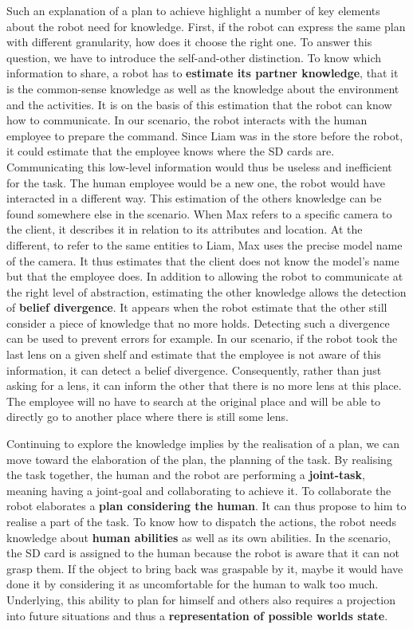 Such an explanation of a plan to achieve highlight a number of key elements about the robot need for knowledge. First, if the robot can express the same plan with different granularity, how does it choose the right one. To answer this question, we have to introduce the self-and-other distinction. To know which information to share, a robot has to \textbf{estimate its partner knowledge}, that it is the common-sense knowledge as well as the knowledge about the environment and the activities. It is on the basis of this estimation that the robot can know how to communicate. In our scenario, the robot interacts with the human employee to prepare the command. Since Liam was in the store before the robot, it could estimate that the employee knows where the SD cards are. Communicating this low-level information would thus be useless and inefficient for the task. The human employee would be a new one, the robot would have interacted in a different way. This estimation of the others knowledge can be found somewhere else in the scenario. When Max refers to a specific camera to the client, it describes it in relation to its attributes and location. At the different, to refer to the same entities to Liam, Max uses the precise model name of the camera. It thus estimates that the client does not know the model's name but that the employee does. In addition to allowing the robot to communicate at the right level of abstraction, estimating the other knowledge allows the detection of \textbf{belief divergence}. It appears when the robot estimate that the other still consider a piece of knowledge that no more holds. Detecting such a divergence can be used to prevent errors for example. In our scenario, if the robot took the last lens on a given shelf and estimate that the employee is not aware of this information, it can detect a belief divergence. Consequently, rather than just asking for a lens, it can inform the other that there is no more lens at this place. The employee will no have to search at the original place and will be able to directly go to another place where there is still some lens.

Continuing to explore the knowledge implies by the realisation of a plan, we can move toward the elaboration of the plan, the planning of the task. By realising the task together, the human and the robot are performing a \textbf{joint-task}, meaning having a joint-goal and collaborating to achieve it. To collaborate the robot elaborates a \textbf{plan considering the human}. It can thus propose to him to realise a part of the task. To know how to dispatch the actions, the robot needs knowledge about \textbf{human abilities} as well as its own abilities. In the scenario, the SD card is assigned to the human because the robot is aware that it can not grasp them. If the object to bring back was graspable by it, maybe it would have done it by considering it as uncomfortable for the human to walk too much. Underlying, this ability to plan for himself and others also requires a projection into future situations and thus a \textbf{representation of possible worlds state}.

